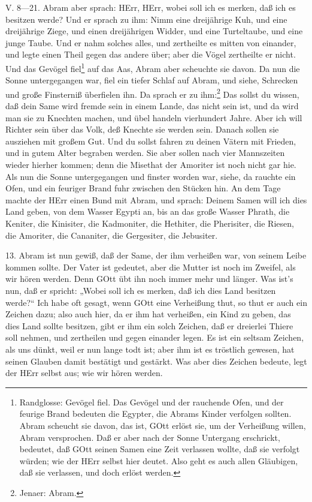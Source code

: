 \begin{schriftzitat}
V. 8—21. Abram aber sprach: HErr, HErr, wobei soll ich es merken, daß ich es besitzen werde? Und er sprach zu ihm: Nimm eine dreijährige Kuh, und eine dreijährige Ziege, und einen dreijährigen Widder, und eine Turteltaube, und eine junge Taube. Und er nahm solches alles, und zertheilte es mitten von einander, und legte einen Theil gegen das andere über; aber die Vögel zertheilte er nicht. Und das Gevögel fiel\footnote{Randglosse: Gevögel fiel. Das Gevögel und der rauchende Ofen, und der feurige Brand bedeuten die Egypter, die Abrams Kinder verfolgen sollten. Abram scheucht sie davon, das ist, GOtt erlöst sie, um der Verheißung willen, Abram versprochen. Daß er aber nach der Sonne Untergang erschrickt, bedeutet, daß GOtt seinen Samen eine Zeit verlassen wollte, daß sie verfolgt würden; wie der HErr selbst hier deutet. Also geht es auch allen Gläubigen, daß sie verlassen, und doch erlöst werden.} auf das Aas, Abram aber scheuchte sie davon. Da nun die Sonne untergegangen war, fiel ein tiefer Schlaf auf Abram, und siehe, Schrecken und große Finsterniß überfielen ihn. Da sprach er zu ihm:\footnote{Jenaer: Abram.} Das sollst du wissen, daß dein Same wird fremde sein in einem Lande, das nicht sein ist, und da wird man sie zu Knechten machen, und übel handeln vierhundert Jahre. Aber ich will Richter sein über das Volk, deß Knechte sie werden sein. Danach sollen sie ausziehen mit großem Gut. Und du sollst fahren zu deinen Vätern mit Frieden, und in gutem Alter begraben werden. Sie aber sollen nach vier Mannszeiten wieder hierher kommen; denn die Misethat der Amoriter ist noch nicht gar hie. Als nun die Sonne untergegangen und finster worden war, siehe, da rauchte ein Ofen, und ein feuriger Brand fuhr zwischen den Stücken hin. An dem Tage machte der HErr einen Bund mit Abram, und sprach: Deinem Samen will ich dies Land geben, von dem Wasser Egypti an, bis an das große Wasser Phrath, die Keniter, die Kinisiter, die Kadmoniter, die Hethiter, die Pherisiter, die Riesen, die Amoriter, die Cananiter, die Gergesiter, die Jebusiter.
\end{schriftzitat}



13. Abram ist nun gewiß, daß der Same, der ihm verheißen war, von seinem Leibe kommen sollte. Der Vater ist gedeutet, aber die Mutter ist noch im Zweifel, als wir hören werden. Denn GOtt übt ihn noch immer mehr und länger. Was ist’s nun, daß er spricht: „Wobei soll ich es merken, daß ich dies Land besitzen werde?“ Ich habe oft gesagt, wenn GOtt eine Verheißung thut, so thut er auch ein Zeichen dazu; also auch hier, da er ihm hat verheißen, ein Kind zu geben, das dies Land sollte besitzen, gibt er ihm ein solch Zeichen, daß er dreierlei Thiere soll nehmen, und zertheilen und gegen einander legen. Es ist ein seltsam Zeichen, als uns dünkt, weil er nun lange todt ist; aber ihm ist es tröstlich gewesen, hat seinen Glauben damit bestätigt und gestärkt. Was aber dies Zeichen bedeute, legt der HErr selbst aus; wie wir hören werden.

